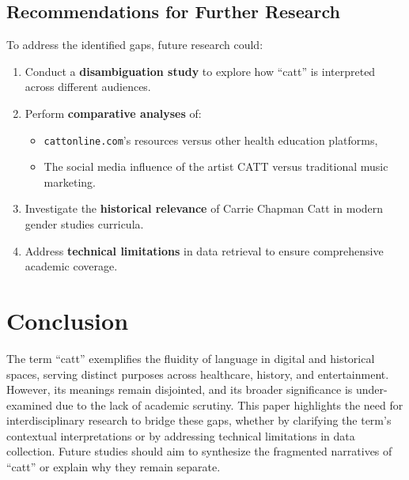 \documentclass{article}
\begin{document}
\subsection{Recommendations for Further Research}
To address the identified gaps, future research could:
\begin{enumerate}
    \item Conduct a \textbf{disambiguation study} to explore how ``catt'' is interpreted across different audiences.
    \item Perform \textbf{comparative analyses} of:
    \begin{itemize}
        \item \texttt{cattonline.com}'s resources versus other health education platforms,
        \item The social media influence of the artist CATT versus traditional music marketing.
    \end{itemize}
    \item Investigate the \textbf{historical relevance} of Carrie Chapman Catt in modern gender studies curricula.
    \item Address \textbf{technical limitations} in data retrieval to ensure comprehensive academic coverage.
\end{enumerate}

\section{Conclusion}
The term ``catt'' exemplifies the fluidity of language in digital and historical spaces, serving distinct purposes across healthcare, history, and entertainment. However, its meanings remain disjointed, and its broader significance is under-examined due to the lack of academic scrutiny. This paper highlights the need for interdisciplinary research to bridge these gaps, whether by clarifying the term's contextual interpretations or by addressing technical limitations in data collection. Future studies should aim to synthesize the fragmented narratives of ``catt'' or explain why they remain separate.

\printbibliography
\end{document}
